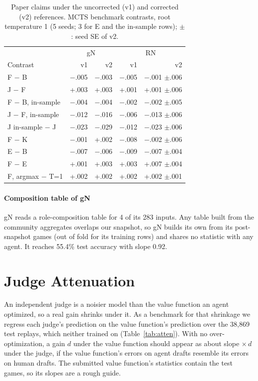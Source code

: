 \documentclass[journal]{IEEEtran}
\begin{document}
\begin{table}[t]
\centering
\caption{Paper claims under the uncorrected (v1) and corrected (v2) references. MCTS benchmark contrasts, root temperature 1 (5 seeds; 3 for E and the in-sample rows); $\pm$: seed SE of v2.}
\label{tab:compclaims}
\setlength{\tabcolsep}{2.5pt}
\small
\begin{tabular}{lrrrr}
\toprule
& \multicolumn{2}{c}{gN} & \multicolumn{2}{c}{RN} \\
Contrast & v1 & v2 & v1 & v2 \\
\midrule
F $-$ B & $-$.005 & $-$.003 & $-$.005 & $-$.001 $\pm$.006 \\
J $-$ F & +.003 & +.003 & +.001 & +.001 $\pm$.006 \\
F $-$ B, in-sample & $-$.004 & $-$.004 & $-$.002 & $-$.002 $\pm$.005 \\
J $-$ F, in-sample & $-$.012 & $-$.016 & $-$.006 & $-$.013 $\pm$.006 \\
J in-sample $-$ J & $-$.023 & $-$.029 & $-$.012 & $-$.023 $\pm$.006 \\
F $-$ K & $-$.001 & +.002 & $-$.008 & $-$.002 $\pm$.006 \\
E $-$ B & $-$.007 & $-$.006 & $-$.009 & $-$.007 $\pm$.004 \\
F $-$ E & +.001 & +.003 & +.003 & +.007 $\pm$.004 \\
F, argmax $-$ T=1 & +.002 & +.002 & +.002 & +.002 $\pm$.001 \\
\bottomrule
\end{tabular}
\end{table}

\paragraph{Composition table of gN} gN reads a role-composition table for 4 of its 283 inputs. Any table built from the community aggregates overlaps our snapshot, so gN builds its own from its post-snapshot games (out of fold for its training rows) and shares no statistic with any agent. It reaches 55.4\% test accuracy with slope 0.92.

\section{Judge Attenuation}
\label{sec:atten}

An independent judge is a noisier model than the value function an agent optimized, so a real gain shrinks under it. As a benchmark for that shrinkage we regress each judge's prediction on the value function's prediction over the 38,869 test replays, which neither trained on (Table~\ref{tab:atten}). With no over-optimization, a gain $d$ under the value function should appear as about slope $\times\, d$ under the judge, if the value function's errors on agent drafts resemble its errors on human drafts. The submitted value function's statistics contain the test games, so its slopes are a rough guide.
\end{document}
